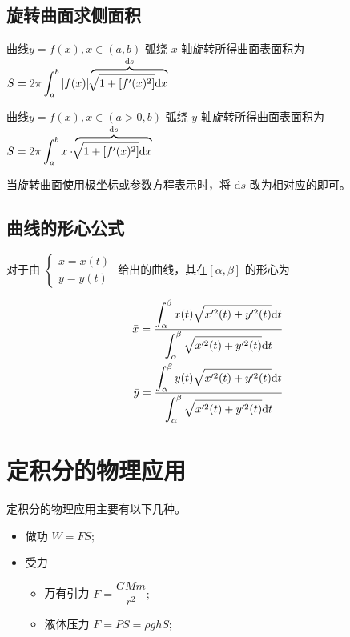 \subsection{旋转曲面求侧面积}

曲线$ y = f(x),x\in(a,b) $ 弧绕 $ x $ 轴旋转所得曲面表面积为
$ \displaystyle S = 2\pi\int_a^b|f(x)|\overbrace{\displaystyle\sqrt[]{1+[f'(x)^2]}\mathrm{d}x}^{\mathrm{d}s} $ 

曲线$ y = f(x),x\in(a > 0,b) $ 弧绕 $ y $ 轴旋转所得曲面表面积为
$ \displaystyle S = 2\pi\int_a^bx\cdot\overbrace{\displaystyle\sqrt[]{1+[f'(x)^2]}\mathrm{d}x}^{\mathrm{d}s} $ 

当旋转曲面使用极坐标或参数方程表示时，将 $ \mathrm{d}s $ 改为相对应的即可。

\subsection{曲线的形心公式}

对于由 $ \left\{\begin{matrix}
    x = x(t)\\ y = y(t)
\end{matrix}\right. $ 给出的曲线，其在$ [\alpha,\beta] $ 的形心为

\begin{equation*}
    \begin{aligned}
        \bar x = \dfrac{\displaystyle \int_\alpha^\beta x(t)\displaystyle\sqrt{x'^2(t)+y'^2(t)}\mathrm{d}t}
        {\displaystyle \int_\alpha^\beta \displaystyle\sqrt{x'^2(t)+y'^2(t)}\mathrm{d}t}\\
        \bar y = \dfrac{\displaystyle \int_\alpha^\beta y(t)\displaystyle\sqrt{x'^2(t)+y'^2(t)}\mathrm{d}t}
        {\displaystyle \int_\alpha^\beta \displaystyle\sqrt{x'^2(t)+y'^2(t)}\mathrm{d}t}\\
    \end{aligned}
\end{equation*}  

\section{定积分的物理应用}
定积分的物理应用主要有以下几种。

\begin{itemize}
    \item 做功 $ W = FS; $ 
    \item 受力 \begin{itemize}
        \item 万有引力 $ F = \dfrac{GMm}{r^2}; $ 
        \item 液体压力 $ F = PS = \rho ghS; $ 
    \end{itemize}
\end{itemize}

